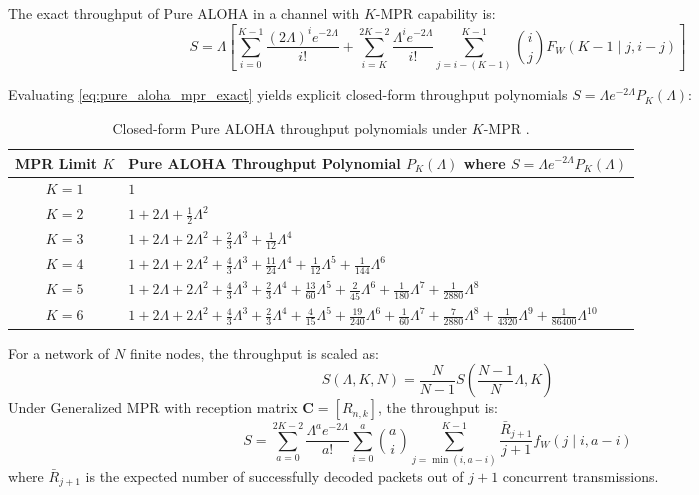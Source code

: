 \begin{theorem}
The exact throughput of Pure ALOHA in a channel with $K$-MPR capability is:
\begin{equation}
    S = \Lambda \left[ \sum_{i=0}^{K-1} \frac{(2\Lambda)^i e^{-2\Lambda}}{i!} + \sum_{i=K}^{2K-2} \frac{\Lambda^i e^{-2\Lambda}}{i!} \sum_{j=i-(K-1)}^{K-1} \binom{i}{j} F_W(K - 1 \mid j, i - j) \right]
    \label{eq:pure_aloha_mpr_exact}
\end{equation}
\end{theorem}

Evaluating \cref{eq:pure_aloha_mpr_exact} yields explicit closed-form throughput polynomials $S = \Lambda e^{-2\Lambda} P_K(\Lambda)$:
\begin{table}[htbp]
\centering
\small
\begin{tabular}{|c|l|}
\hline
\textbf{MPR Limit $K$} & \textbf{Pure ALOHA Throughput Polynomial $P_K(\Lambda)$ where $S = \Lambda e^{-2\Lambda} P_K(\Lambda)$} \\ \hline
$K = 1$ & $1$ \\ \hline
$K = 2$ & $1 + 2\Lambda + \frac{1}{2}\Lambda^2$ \\ \hline
$K = 3$ & $1 + 2\Lambda + 2\Lambda^2 + \frac{2}{3}\Lambda^3 + \frac{1}{12}\Lambda^4$ \\ \hline
$K = 4$ & $1 + 2\Lambda + 2\Lambda^2 + \frac{4}{3}\Lambda^3 + \frac{11}{24}\Lambda^4 + \frac{1}{12}\Lambda^5 + \frac{1}{144}\Lambda^6$ \\ \hline
$K = 5$ & $1 + 2\Lambda + 2\Lambda^2 + \frac{4}{3}\Lambda^3 + \frac{2}{3}\Lambda^4 + \frac{13}{60}\Lambda^5 + \frac{2}{45}\Lambda^6 + \frac{1}{180}\Lambda^7 + \frac{1}{2880}\Lambda^8$ \\ \hline
$K = 6$ & $1 + 2\Lambda + 2\Lambda^2 + \frac{4}{3}\Lambda^3 + \frac{2}{3}\Lambda^4 + \frac{4}{15}\Lambda^5 + \frac{19}{240}\Lambda^6 + \frac{1}{60}\Lambda^7 + \frac{7}{2880}\Lambda^8 + \frac{1}{4320}\Lambda^9 + \frac{1}{86400}\Lambda^{10}$ \\ \hline
\end{tabular}
\caption{Closed-form Pure ALOHA throughput polynomials under $K$-MPR \cite{arun2013order}.}
\label{tab:aloha_mpr_polynomials}
\end{table}

For a network of $N$ finite nodes, the throughput is scaled as:
\begin{equation}
    S(\Lambda, K, N) = \frac{N}{N - 1} S\left( \frac{N - 1}{N}\Lambda, K \right)
\end{equation}
Under Generalized MPR with reception matrix $\mathbf{C} = [R_{n,k}]$, the throughput is:
\begin{equation}
    S = \sum_{a=0}^{2K-2} \frac{\Lambda^a e^{-2\Lambda}}{a!} \sum_{i=0}^a \binom{a}{i} \sum_{j=\min(i, a-i)}^{K-1} \frac{\bar{R}_{j+1}}{j+1} f_W(j \mid i, a - i)
\end{equation}
where $\bar{R}_{j+1}$ is the expected number of successfully decoded packets out of $j+1$ concurrent transmissions.

